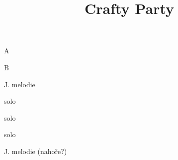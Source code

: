 \documentclass[timestamp]{jazzgrid}
\title{Crafty Party}
\begin{document}
\maketitle
\begin{musicsection}{A}
\barline
	{}
	{\barfour{}{}{}{}{}}
	{}
	{}
\barline
	{}
	{\barfour{}{}{}{}{}}
	{}
	{}
\end{musicsection}
\begin{musicsection}{B}
\barline
	{}
	{\barfour{}{}{}{}{}}
	{}
	{\barfour{}{}{}{}{}}
\barline
	{}
	{\barfour{}{}{}{}{}}
	{}
	{}
\end{musicsection}

\footnotesize
\begin{description}[noitemsep,align=right,labelwidth=\widthof{\bfseries{AABA}}]
	\item [AABA] J. melodie
	\item [AABA] solo
	\item [AABA] solo
	\item [AABA] solo
	\item [AABA] J. melodie (nahoře?)
\end{description}
\end{document}
